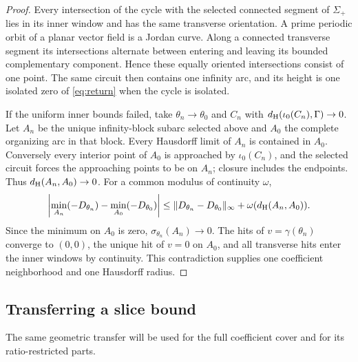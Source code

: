 \begin{proof}
Every intersection of the cycle with the selected connected segment
of \(\Sigma_+\) lies in its inner window and has the same transverse
orientation. A prime periodic orbit of a planar vector field is a
Jordan curve. Along a connected transverse segment its intersections
alternate between entering and leaving its bounded complementary
component. Hence these equally oriented intersections consist of one
point. The same circuit then contains one infinity arc, and its height
is one isolated zero of \eqref{eq:return} when the cycle is isolated.

If the uniform inner bounds failed, take
\(\theta_n\to\theta_0\) and \(C_n\) with
\(d_{\rm H}(\iota_0(C_n),\Gamma)\to0\).
Let \(A_n\) be the unique infinity-block subarc selected above and \(A_0\)
the complete organizing arc in that block.
Every Hausdorff limit of \(A_n\) is contained in \(A_0\).
Conversely every interior point of \(A_0\) is approached by
\(\iota_0(C_n)\), and the selected circuit forces the approaching
points to be on \(A_n\); closure includes the endpoints.
Thus \(d_{\rm H}(A_n,A_0)\to0\).
For a common modulus of continuity \(\omega\),
\[
 \left|\min_{A_n}(-D_{\theta_n})-\min_{A_0}(-D_{\theta_0})\right|
 \le \|D_{\theta_n}-D_{\theta_0}\|_\infty
          +\omega(d_{\rm H}(A_n,A_0)).
\]
Since the minimum on \(A_0\) is zero, \(\sigma_{\theta_n}(A_n)\to0\).
The hits of \(v=\gamma(\theta_n)\) converge to \((0,0)\), the unique
hit of \(v=0\) on \(A_0\), and all transverse hits enter the inner
windows by continuity. This contradiction supplies one coefficient
neighborhood and one Hausdorff radius.
\end{proof}

\subsection{Transferring a slice bound}

The same geometric transfer will be used for the full coefficient cover
and for its ratio-restricted parts.

